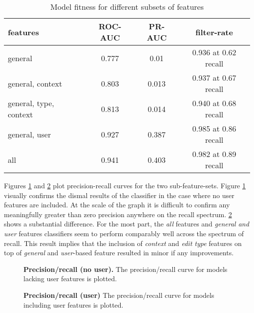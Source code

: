\documentclass{sig-alternate}
\begin{document}
\begin{table}
\label{tab:model_fitness}
\centering
\caption{Model fitness for different subsets of features}
\begin{tabular}{l|c|c|c} \hline
features & ROC-AUC & PR-AUC & filter-rate \\ \hline
general & 0.777 & 0.01 & 0.936 at 0.62 recall \\  \hline
general, context & 0.803 & 0.013 & 0.937 at 0.67 recall \\  \hline
general, type, context & 0.813 & 0.014 & 0.940 at 0.68 recall \\  \hline
general, user & 0.927 & 0.387 & 0.985 at 0.86 recall \\  \hline
all & 0.941 & 0.403 & 0.982 at 0.89 recall \\  \hline
\end{tabular}
\end{table}

Figures \ref{fig:precision_recall_no_user} and \ref{fig:precision_recall_user} plot precision-recall curves for the two sub-feature-sets. Figure \ref{fig:precision_recall_no_user} visually confirms the dismal results of the classifier in the case where no user features are included.  At the scale of the graph it is difficult to confirm any meaningfully greater than zero precision anywhere on the recall spectrum. \ref{fig:precision_recall_user} shows a substantial difference.  For the most part, the \textit{all} features and \textit{general and user} features classifiers seem to perform comparably well across the spectrum of recall.  This result implies that the inclusion of \textit{context} and \textit{edit type} features on top of \textit{general} and \textit{user}-based feature resulted in minor if any improvements.

\begin{figure}
\label{fig:precision_recall_no_user}
\centering
{}
\caption{\textbf{Precision/recall (no user).} The precision/recall curve for models lacking user features is plotted.}
\end{figure}

\begin{figure}
\label{fig:precision_recall_user}
\centering
{}
\caption{\textbf{Precision/recall (user)} The precision/recall curve for models including user features is plotted.}
\end{figure}
\end{document}
